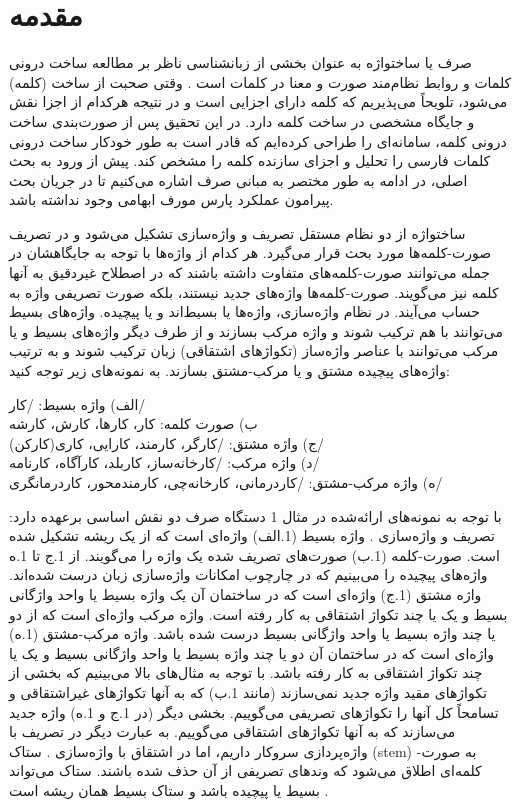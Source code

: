 \documentclass[12pt,onecolumn,a4paper]{article}
\begin{document}
    \section{مقدمه}
    صرف یا ساختواژه  به عنوان بخشی از زبان‏شناسی ناظر بر مطالعه ساخت درونی کلمات و روابط نظام‌مند صورت و معنا در کلمات است  . وقتی صحبت از ساخت (کلمه) می‌شود، تلویحاً می‌پذیریم که کلمه دارای اجزایی است و در نتیجه هرکدام از اجزا نقش و جایگاه مشخصی در ساخت کلمه دارد. در این تحقیق پس از صورت‌بندی ساخت درونی کلمه، سامانه‌ای را طراحی کرده‌ایم که قادر است به طور خودکار ساخت درونی کلمات فارسی را تحلیل و اجزای سازنده کلمه را مشخص کند. پیش از ورود به بحث اصلی، در ادامه به طور مختصر به مبانی صرف اشاره می‌کنیم تا در جریان بحث پیرامون عملکرد پارس مورف ابهامی وجود نداشته باشد.
    \par
    ساختواژه از دو نظام مستقل تصریف  و واژه‌سازی  تشکیل می‌شود و در تصریف صورت-کلمه‌ها  مورد بحث قرار می‌گیرد. هر کدام از واژه‌ها  با توجه به جایگاهشان در جمله می‌توانند صورت-کلمه‌های متفاوت داشته باشند که در اصطلاح غیردقیق به آنها کلمه  نیز می‌گویند. صورت-کلمه‌ها واژه‌های جدید نیستند، بلکه صورت تصریفی واژه‌ به حساب می‌آیند. در نظام واژه‌سازی، واژه‌ها یا بسیط‌اند و یا پیچیده. واژه‌های بسیط می‌توانند با هم ترکیب شوند و واژه مرکب بسازند و از طرف دیگر واژه‌های بسیط و یا مرکب می‌توانند با عناصر واژه‌ساز (تکواژهای اشتقاقی) زبان ترکیب شوند و به ترتیب واژه‌های پیچیده مشتق و یا مرکب-مشتق بسازند. به نمونه‌های زیر توجه کنید:
    \par\noindent
    الف) واژه بسیط: /کار/ \\
    ب) صورت کلمه: کار، کارها، کارش، کارشه \\
    ج) واژه مشتق: /کارگر، کارمند، کارایی، کاری(کارکن)/ \\
    د) واژه مرکب: /کارخانه‌ساز، کاربلد، کارآگاه، کارنامه/ \\
    ه) واژه مرکب-مشتق: /کاردرمانی، کارخانه‌چی، کارمندمحور، کاردرمانگری/ \\
    \par
    با توجه به نمونه‌های ارائه‌شده در مثال 1 دستگاه صرف دو نقش اساسی برعهده دارد: تصریف و واژه‌‌سازی {\mfo\citep{taba_82}}. واژه بسیط (1.الف) واژه‌ای است که از یک ریشه تشکیل شده است. صورت-کلمه (1.ب) صورت‌های تصریف شده یک واژه را می‌گویند. از 1.ج تا 1.ه واژه‌های پیچیده را می‌بینیم که در چارچوب امکانات واژه‌سازی زبان درست شده‌اند. واژه مشتق (1.ج) واژه‌ای است که در ساختمان آن یک واژه بسیط یا واحد واژگانی بسیط و یک یا چند تکواژ اشتقاقی به کار رفته است. واژه مرکب واژه‌ای است که از دو یا چند واژه بسیط یا واحد واژگانی بسیط درست شده باشد. واژه مرکب-مشتق (1.ه) واژه‌ای است که در ساختمان آن دو یا چند واژه بسیط یا واحد واژگانی بسیط و یک یا چند تکواژ اشتقاقی به کار رفته باشد. با توجه به مثال‌های بالا می‌بینیم که بخشی از تکواژهای مقید واژه جدید نمی‌سازند (مانند 1.ب) که به آنها تکواژهای غیراشتقاقی و تسامحاً کل آنها را تکواژهای تصریفی می‌گوییم. بخشی دیگر (در 1.ج و 1.ه) واژه جدید می‌سازند که به آنها تکواژهای اشتقاقی می‌گوییم. به عبارت دیگر در تصریف با واژه‌پردازی سروکار داریم، اما در اشتقاق با واژه‌سازی {\mfo\citep{taba_76}}. ستاک (stem) به صورت-کلمه‌ای اطلاق می‌شود که وندهای تصریفی از آن حذف شده باشند. ستاک می‌تواند بسیط یا پیچیده باشد و ستاک بسیط همان ریشه است .
\end{document}
